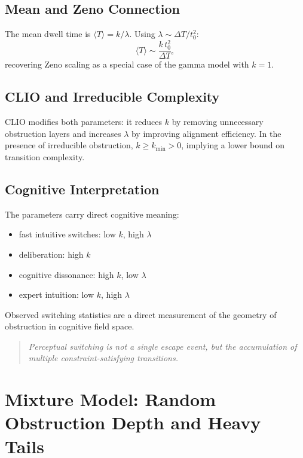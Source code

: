 \documentclass[12pt,a4paper]{article}
\begin{document}
\subsection{Mean and Zeno Connection}

The mean dwell time is $\langle T \rangle = k/\lambda$. Using $\lambda \sim \Delta T / t_0^2$:
\[
\langle T \rangle \sim \frac{k\,t_0^2}{\Delta T},
\]
recovering Zeno scaling as a special case of the gamma model with $k=1$.

\subsection{CLIO and Irreducible Complexity}

CLIO modifies both parameters: it reduces $k$ by removing unnecessary obstruction layers and increases $\lambda$ by improving alignment efficiency. In the presence of irreducible obstruction, $k \geq k_{\min} > 0$, implying a lower bound on transition complexity.

\subsection{Cognitive Interpretation}

The parameters carry direct cognitive meaning:
\begin{itemize}[noitemsep]
\item fast intuitive switches: low $k$, high $\lambda$
\item deliberation: high $k$
\item cognitive dissonance: high $k$, low $\lambda$
\item expert intuition: low $k$, high $\lambda$
\end{itemize}

Observed switching statistics are a direct measurement of the geometry of obstruction in cognitive field space.

\begin{quote}
\emph{Perceptual switching is not a single escape event, but the accumulation of multiple constraint-satisfying transitions.}
\end{quote}

\section{Mixture Model: Random Obstruction Depth and Heavy Tails}
\label{sec:mixture}
\end{document}
